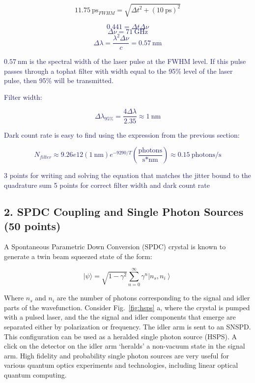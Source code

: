 \documentclass[11pt]{caltech_thesis} %
\begin{document}
\begin{enumerate}
{  \[ 11.75~\text{ps}_{FWHM} = \sqrt{ \Delta t^2 + (10~\text{ps})^2}\]

  }

  \textcolor{midnightblue}{

  \[ 0.441 = \Delta t \Delta \nu \] \[\Delta \nu = 71~\text{GHz}\]
  \[\Delta \lambda = \frac{\lambda^2 \Delta \nu}{c} = 0.57~\text{nm}\]

  }

  \textcolor{midnightblue}{ \(0.57~\text{nm}\) is the spectral width of
  the laser pulse at the FWHM level. If this pulse passes through a
  tophat filter with width equal to the 95\% level of the laser pulse,
  then 95\% will be transmitted. }

  \textcolor{midnightblue}{Filter width: }

  \textcolor{midnightblue}{

  \[\Delta \lambda_{95\%} = \frac{4 \Delta \lambda}{2.35} \approx \boxed{1~\text{nm}} \]

  }

  \textcolor{midnightblue}{Dark count rate is easy to find using the
  expression from the previous section: }

  \textcolor{midnightblue}{

  \[\boxed{N_{filter} \approx 9.26e12 (1~\text{nm}) e^{-9290/T} (\frac{\text{photons}}{\text{s*nm}})} \approx 0.15~\text{photons/s} \]

  }

  \textcolor{midnightblue}{3 points for writing and solving the equation
  that matches the jitter bound to the quadrature sum }
  \textcolor{midnightblue}{5 points for correct filter width and dark
  count rate}
\end{enumerate}

\hypertarget{spdc-coupling-and-single-photon-sources-50-points}{%
\subsection{2. SPDC Coupling and Single Photon Sources (50
points)}\label{spdc-coupling-and-single-photon-sources-50-points}}

A Spontaneous Parametric Down Conversion (SPDC) crystal is known to
generate a twin beam squeezed state of the form:

\[|\psi\rangle= \sqrt{1 - \gamma^2} \sum_{n=0}^{\infty} \gamma^{n}\left|n_{s}, n_{i}\right\rangle \]

Where \(n_s\) and \(n_i\) are the number of photons corresponding to the
signal and idler parts of the wavefunction. Consider Fig.~\ref{fig:hsps}
a, where the crystal is pumped with a pulsed laser, and the the signal
and idler components that emerge are separated either by polarization or
frequency. The idler arm is sent to an SNSPD. This configuration can be
used as a heralded single photon source (HSPS). A click on the detector
on the idler arm `heralds' a non-vacuum state in the signal arm. High
fidelity and probability single photon sources are very useful for
various quantum optics experiments and technologies, including linear
optical quantum computing.
\end{document}
